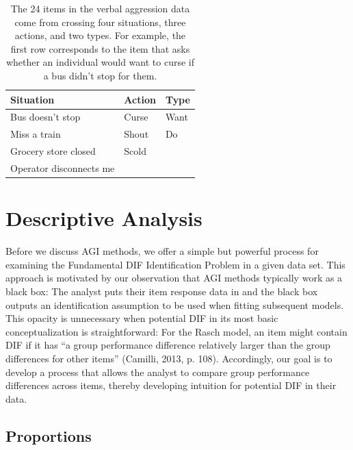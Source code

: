\documentclass[
  english,
  man,floatsintext]{apa6}
\begin{document}
\begin{table}[h]
\caption{The 24 items in the verbal aggression data come from crossing four situations, three actions, and two types. For example, the first row corresponds to the item that asks whether an individual would want to curse if a bus didn’t stop for them.}
\centering
\begin{tabular}{|p{5cm}|p{3cm}|p{3cm}|}
\toprule
 \textbf{Situation} & \textbf{Action} & \textbf{Type} \\\midrule
 Bus doesn't stop & Curse & Want \\\hline
 Miss a train & Shout & Do  \\\hline
 Grocery store closed & Scold & \\\hline
 Operator disconnects me &  & \\
\bottomrule
\end{tabular}
\label{table:verbal}
\end{table}

\hypertarget{descriptive}{%
\section{Descriptive Analysis}\label{descriptive}}

Before we discuss AGI methods, we offer a simple but powerful process for examining the Fundamental DIF Identification Problem in a given data set. This approach is motivated by our observation that AGI methods typically work as a black box: The analyst puts their item response data in and the black box outputs an identification assumption to be used when fitting subsequent models. This opacity is unnecessary when potential DIF in its most basic conceptualization is straightforward: For the Rasch model, an item might contain DIF if it has ``a group performance difference relatively larger than the group differences for other items'' (Camilli, 2013, p. 108). Accordingly, our goal is to develop a process that allows the analyst to compare group performance differences across items, thereby developing intuition for potential DIF in their data.

\hypertarget{proportions}{%
\subsection{Proportions}\label{proportions}}
\end{document}
